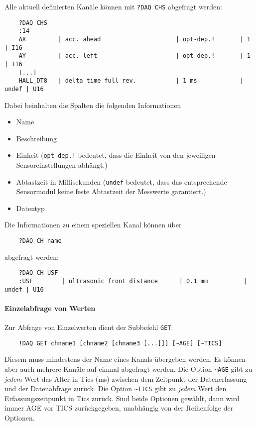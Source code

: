 Alle aktuell definierten Kanäle können mit \verb|?DAQ CHS| abgefragt werden:
\begin{verbatim}
	?DAQ CHS
	:14
	AX         | acc. ahead                     | opt-dep.!       | 1     | I16 
	AY         | acc. left                      | opt-dep.!       | 1     | I16 
	[...]
	HALL_DT8   | delta time full rev.           | 1 ms            | undef | U16 
\end{verbatim}
Dabei beinhalten die Spalten die folgenden Informationen
\begin{itemize}
	\item Name
	\item Beschreibung
	\item Einheit (\verb|opt-dep.!| bedeutet, dass die Einheit von den jeweiligen Sensoreinstellungen abhängt.)
	\item Abtastzeit in Millisekunden (\verb|undef| bedeutet, dass das entsprechende Sensormodul keine feste Abtastzeit der Messwerte garantiert.)
	\item Datentyp
\end{itemize}

Die Informationen zu einem speziellen Kanal können über
\begin{verbatim}
	?DAQ CH name
\end{verbatim}
abgefragt werden:
\begin{verbatim}
	?DAQ CH USF
	:USF        | ultrasonic front distance      | 0.1 mm          | undef | U16
\end{verbatim}



\paragraph{Einzelabfrage von Werten}

Zur Abfrage von Einzelwerten dient der Subbefehl \verb|GET|:
\begin{verbatim}
	!DAQ GET chname1 [chname2 [chname3 [...]]] [~AGE] [~TICS]
\end{verbatim}
Diesem muss mindestens der Name eines Kanals übergeben werden. Es können aber auch mehrere Kanäle auf einmal abgefragt werden. Die Option \verb|~AGE| gibt zu \emph{jedem} Wert das Alter in Tics (\dah ms) zwischen dem Zeitpunkt der Datenerfassung und der Datenabfrage zurück. Die Option \verb|~TICS| gibt zu \emph{jedem} Wert den Erfassungszeitpunkt in Tics zurück. Sind beide Optionen gewählt, dann wird immer AGE vor TICS zurückgegeben, unabhängig von der Reihenfolge der Optionen.

